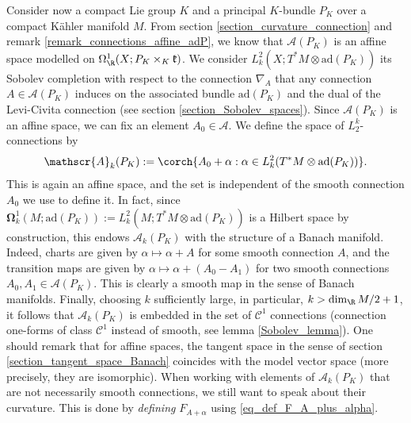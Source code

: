 Consider now a compact Lie group \(K\) and a principal \(K\)-bundle \(P_K\) over a compact Kähler manifold \(M\). From section \ref{section_curvature_connection} and remark \ref{remark_connections_affine_adP}, we know that \(\mathscr{A}(P_K)\) is an affine space modelled on \(\Omega^1_\R(X; P_K \times _K \mathfrak{k})\). We consider \(L_k^2(X; T^*M \otimes \mathrm{ad}(P_K))\) its Sobolev completion with respect to the connection \(\nabla_A\) that any connection \(A\in \mathscr{A}(P_K)\) induces on the associated bundle \(\mathrm{ad}(P_K)\) and the dual of the Levi-Civita connection (see section \ref{section_Sobolev_spaces}). Since \(\mathscr{A}(P_K)\) is an affine space, we can fix an element \(A_0\in \mathscr{A}\). We define the space of \(L_2^k\)-connections by 
\[
\mathscr{A}_k(P_K):=\corch{A_0+\alpha : \alpha \in L_k^2(T^*M \otimes \mathrm{ad}(P_K))}.
\]
This is again an affine space, and the set is independent of the smooth connection \(A_0\) we use to define it. In fact, since \(\bm{\Omega}^1_k(M;\mathrm{ad}(P_K)):=L_k^2(M;T^*M \otimes \mathrm{ad}(P_K))\) is a Hilbert space by construction, this endows \(\mathscr{A}_k(P_K)\) with the structure of a Banach manifold. Indeed, charts are given by \(\alpha \mapsto \alpha + A\) for some smooth connection \(A\), and the transition maps are given by \(\alpha \mapsto \alpha + (A_0-A_1)\) for two smooth connections \(A_0, A_1 \in \mathscr{A}(P_K)\). This is clearly a smooth map in the sense of Banach manifolds. Finally, choosing \(k\) sufficiently large, in particular, \(k>\dim_\R M /2+1\), it follows that \(\mathscr{A}_k(P_K)\) is embedded in the set of \(\mathscr{C}^1\) connections (connection one-forms of class \(\mathscr{C}^1\) instead of smooth, see lemma \ref{Sobolev_lemma}). One should remark that for affine spaces, the tangent space in the sense of section \ref{section_tangent_space_Banach} coincides with the model vector space (more precisely, they are isomorphic). When working with elements of \(\mathscr{A}_k(P_K)\) that are not necessarily smooth connections, we still want to speak about their curvature. This is done by \textit{defining} \(F_{A+\alpha}\) using \eqref{eq_def_F_A_plus_alpha}. 

